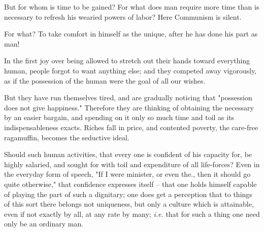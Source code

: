 \documentclass[a4paper]{book}
\begin{document}
But for whom is time to be gained? For what does man require more time than is 
necessary to refresh his wearied powers of labor? Here Communism is silent.

For what? To take comfort in himself as the unique, after he has done his part 
as man!

In the first joy over being allowed to stretch out their hands toward 
everything human, people forgot to want anything else; and they competed away 
vigorously, as if the possession of the human were the goal of all our wishes.

But they have run themselves tired, and are gradually noticing that 
"{}possession does not give happiness."{} Therefore they are thinking of 
obtaining the necessary by an easier bargain, and spending on it only so much 
time and toil as its indispensableness exacts. Riches fall in price, and 
contented poverty, the care-free ragamuffin, becomes the seductive ideal.

Should such human activities, that every one is confident of his capacity for, 
be highly salaried, and sought for with toil and expenditure of all 
life-forces? Even in the everyday form of speech, "{}If I were minister, or 
even the., then it should go quite otherwise,"{} that confidence expresses 
itself -- that one holds himself capable of playing the part of such a 
dignitary; one does get a perception that to things of this sort there belongs 
not uniqueness, but only a culture which is attainable, even if not exactly by 
all, at any rate by many; \textit{i.e.} that for such a thing one need only be 
an ordinary man.
\end{document}

